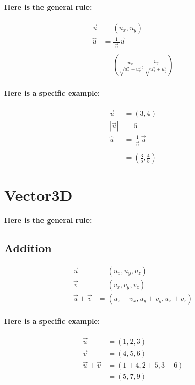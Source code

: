 \documentclass[twoside]{article}
\begin{document}
\paragraph{Here is the general rule:}

\begin{align*}
  \vec{u} & = (u_x, u_y) \\
  \hat{u} & = \frac{1}{|\vec{u}|} \vec{u} \\
            & = (\frac{u_x}{\sqrt{u_x^2 + u_y^2}}, \frac{u_y}{\sqrt{u_x^2 + u_y^2}})
  \end{align*}

\paragraph{Here is a specific example:}

\begin{align*}
  \vec{u} & = (3, 4) \\
  |\vec{u}| & = 5 \\
  \hat{u} & = \frac{1}{|\vec{u}|} \vec{u} \\
            & = (\frac{3}{5}, \frac{4}{5})
  \end{align*}

\section{Vector3D}

\paragraph{Here is the general rule:}

\subsection{Addition}

\begin{align*}
  \vec{u} & = (u_x, u_y, u_z) \\
  \vec{v} & = (v_x, v_y, v_z) \\
  \vec{u} + \vec{v} & = (u_x + v_x, u_y + v_y, u_z + v_z) 
  \end{align*}

\paragraph{Here is a specific example:}

\begin{align*}
  \vec{u} & = (1, 2, 3) \\
  \vec{v} & = (4, 5, 6) \\
  \vec{u} + \vec{v} & = (1 + 4, 2 + 5, 3 + 6) \\
                          & = (5, 7, 9)
  \end{align*}
\end{document}
